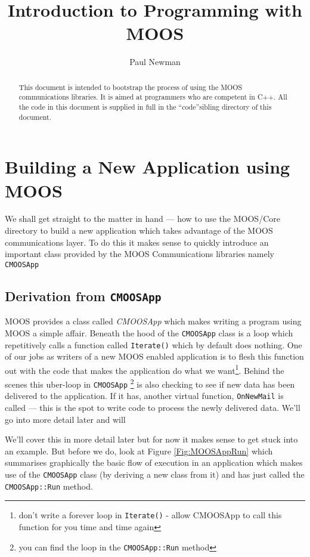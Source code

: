 \documentclass[a4paper,10pt]{article}
\title{Introduction to Programming with MOOS}
\author{Paul Newman}
\newcommand{\Code}[1]{\texttt{#1} }
\newcommand{\code}[1]{\Code{#1} }
\begin{document}
\maketitle

\begin{center}
\end{center}

\begin{abstract}
This document is intended to bootstrap the process of using the
MOOS communications libraries. It is aimed at programmers who are
competent in C++. All the code in this document is supplied
in full in the ``code''sibling directory of this document.
\end{abstract}
\newpage
\tableofcontents
\newpage
\section{Building a New Application using MOOS}

We shall get straight to the matter in hand --- how to use the
MOOS/Core directory to build a new application which takes
advantage of the MOOS communications layer. To do this it makes
sense to quickly introduce an important class provided by the MOOS
Communications libraries namely \code{CMOOSApp}


\subsection{Derivation from \code{CMOOSApp}}
MOOS provides a class called \textit{CMOOSApp} which makes writing
a program using MOOS a simple affair. Beneath the hood of the
\code{CMOOSApp} class is a loop which repetitively calls a
function called \code{Iterate()} which by default does nothing.
One of our jobs as writers of a new MOOS enabled application is to
flesh this function out with the code that makes the application
do what we want\footnote{don't write a forever loop in
\code{Iterate()} - allow CMOOSApp to call this function for you
time and time again}. Behind the scenes this uber-loop in
\code{CMOOSApp}\footnote{you can find the loop in the
\code{CMOOSApp::Run} method} is also checking to see if new data
has been delivered to the application. If it has, another virtual
function, \code{OnNewMail} is called --- this is the spot to write
code to process the newly delivered data. We'll go into more
detail later and will


We'll cover this in more detail later but for now it makes sense
to get stuck into an example. But before we do, look at Figure
\ref{Fig:MOOSAppRun} which summarises graphically the basic flow
of execution in an application which makes use of the \code{CMOOSApp}
class (by deriving a new class from it) and has just called the
\code{CMOOSApp::Run} method.
\end{document}
